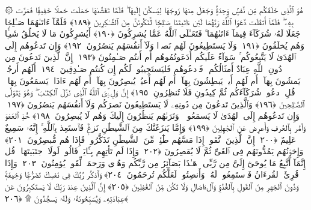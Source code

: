  ۞ هُوَ ٱلَّذِى خَلَقَكُم مِّن نَّفسٍۢ وَٟحِدَةٍۢ وَجَعَلَ مِنهَا زَوجَهَا لِيَسكُنَ إِلَيهَا ۖ فَلَمَّا تَغَشَّىٰهَا حَمَلَت حَملًا خَفِيفًۭا فَمَرَّت بِهِۦ ۖ فَلَمَّآ أَثقَلَت دَّعَوَا ٱللَّهَ رَبَّهُمَا لَئِن ءَاتَيتَنَا صَـٰلِحًۭا لَّنَكُونَنَّ مِنَ ٱلشَّـٰكِرِينَ ﴿١٨٩﴾
 فَلَمَّآ ءَاتَىٰهُمَا صَـٰلِحًۭا جَعَلَا لَهُۥ شُرَكَآءَ فِيمَآ ءَاتَىٰهُمَا ۚ فَتَعَـٰلَى ٱللَّهُ عَمَّا يُشرِكُونَ ﴿١٩٠﴾
 أَيُشرِكُونَ مَا لَا يَخلُقُ شَيـًۭٔا وَهُم يُخلَقُونَ ﴿١٩١﴾
 وَلَا يَستَطِيعُونَ لَهُم نَصرًۭا وَلَآ أَنفُسَهُم يَنصُرُونَ ﴿١٩٢﴾
 وَإِن تَدعُوهُم إِلَى ٱلهُدَىٰ لَا يَتَّبِعُوكُم ۚ سَوَآءٌ عَلَيكُم أَدَعَوتُمُوهُم أَم أَنتُم صَـٰمِتُونَ ﴿١٩٣﴾
 إِنَّ ٱلَّذِينَ تَدعُونَ مِن دُونِ ٱللَّهِ عِبَادٌ أَمثَالُكُم ۖ فَٱدعُوهُم فَليَستَجِيبُوا۟ لَكُم إِن كُنتُم صَـٰدِقِينَ ﴿١٩٤﴾
 أَلَهُم أَرجُلٌۭ يَمشُونَ بِهَآ ۖ أَم لَهُم أَيدٍۢ يَبطِشُونَ بِهَآ ۖ أَم لَهُم أَعيُنٌۭ يُبصِرُونَ بِهَآ ۖ أَم لَهُم ءَاذَانٌۭ يَسمَعُونَ بِهَا ۗ قُلِ ٱدعُوا۟ شُرَكَآءَكُم ثُمَّ كِيدُونِ فَلَا تُنظِرُونِ ﴿١٩٥﴾
 إِنَّ وَلِۦِّىَ ٱللَّهُ ٱلَّذِى نَزَّلَ ٱلكِتَـٰبَ ۖ وَهُوَ يَتَوَلَّى ٱلصَّـٰلِحِينَ ﴿١٩٦﴾
 وَٱلَّذِينَ تَدعُونَ مِن دُونِهِۦ لَا يَستَطِيعُونَ نَصرَكُم وَلَآ أَنفُسَهُم يَنصُرُونَ ﴿١٩٧﴾
 وَإِن تَدعُوهُم إِلَى ٱلهُدَىٰ لَا يَسمَعُوا۟ ۖ وَتَرَىٰهُم يَنظُرُونَ إِلَيكَ وَهُم لَا يُبصِرُونَ ﴿١٩٨﴾
 خُذِ ٱلعَفوَ وَأمُر بِٱلعُرفِ وَأَعرِض عَنِ ٱلجَٰهِلِينَ ﴿١٩٩﴾
 وَإِمَّا يَنزَغَنَّكَ مِنَ ٱلشَّيطَٰنِ نَزغٌۭ فَٱستَعِذ بِٱللَّهِ ۚ إِنَّهُۥ سَمِيعٌ عَلِيمٌ ﴿٢٠٠﴾
 إِنَّ ٱلَّذِينَ ٱتَّقَوا۟ إِذَا مَسَّهُم طَٰٓئِفٌۭ مِّنَ ٱلشَّيطَٰنِ تَذَكَّرُوا۟ فَإِذَا هُم مُّبصِرُونَ ﴿٢٠١﴾
 وَإِخوَٟنُهُم يَمُدُّونَهُم فِى ٱلغَىِّ ثُمَّ لَا يُقصِرُونَ ﴿٢٠٢﴾
 وَإِذَا لَم تَأتِهِم بِـَٔايَةٍۢ قَالُوا۟ لَولَا ٱجتَبَيتَهَا ۚ قُل إِنَّمَآ أَتَّبِعُ مَا يُوحَىٰٓ إِلَىَّ مِن رَّبِّى ۚ هَـٰذَا بَصَآئِرُ مِن رَّبِّكُم وَهُدًۭى وَرَحمَةٌۭ لِّقَومٍۢ يُؤمِنُونَ ﴿٢٠٣﴾
 وَإِذَا قُرِئَ ٱلقُرءَانُ فَٱستَمِعُوا۟ لَهُۥ وَأَنصِتُوا۟ لَعَلَّكُم تُرحَمُونَ ﴿٢٠٤﴾
 وَٱذكُر رَّبَّكَ فِى نَفسِكَ تَضَرُّعًۭا وَخِيفَةًۭ وَدُونَ ٱلجَهرِ مِنَ ٱلقَولِ بِٱلغُدُوِّ وَٱلءَاصَالِ وَلَا تَكُن مِّنَ ٱلغَٰفِلِينَ ﴿٢٠٥﴾
 إِنَّ ٱلَّذِينَ عِندَ رَبِّكَ لَا يَستَكبِرُونَ عَن عِبَادَتِهِۦ وَيُسَبِّحُونَهُۥ وَلَهُۥ يَسجُدُونَ ۩ ﴿٢٠٦﴾
 
